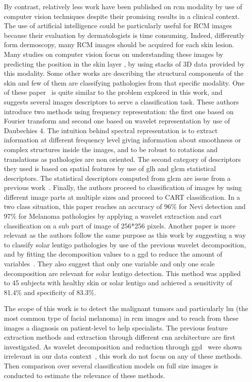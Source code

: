 \documentclass[journal,article,submit,moreauthors,pdftex, applsci]{Definitions/mdpi}
\begin{document}
By contrast, relatively less work have been published on \ac{rcm} modality by use of computer vision techniques despite their promising results in a clinical context. The use of artificial intelligence could be particularly useful for RCM images because their evaluation by  dermatologists is time consuming. Indeed, differently form dermoscopy, many RCM images should be acquired for each skin lesion. Many studies on computer vision focus on understanding these images by predicting the position in the skin layer \cite{Somoza2014,Hames2016}, by using stacks of 3D data provided by this modality. Some other works are describing the structural components of the skin \cite{Gareau2010} and few of them are classifying pathologies from that specific modality. One of these paper~\cite{Wiltgen2008} is quite similar to the problem explored in this work, and suggests several images descriptors to serve a classification task. These authors introduce two methods using frequency representation: the first one based on Fourier transform and second one based on wavelet representation by use of Daubechies 4. The intuition behind spectral representation is to extract information at different frequency level giving information about smoothness or complex structures inside the images, and to be robust to rotations and translations as pathologies are non oriented. The second category of descriptors they used is based on spatial features by use of \ac{glh} and \ac{glcm} statistical descriptors. The statistical descriptors computed from \ac{glcm} are issue from a previous work~\cite{Haralick1973}. Finally, the authors proceed to classification of images by using different image parts at multiple sizes and proceed to CART classification. In a two class situation, this paper reaches an accuracy of 96\% for Nevi detection and 97\% for Melanoma pathologies by applying a wavelet extraction and \ac{cart} classification on a sub part of image of 256*256 pixels. Another paper is more relevant as the authors follow the same purpose as this work by suggesting a way to classify solar lentigo pathologies by use of the previous wavelet decomposition, and by fitting the decomposition values to a \ac{ggd} to reduce the amount of variables~\cite{Halimi2017a}. They also suggest that only one variable and only one scale decomposition are relevant for solar lentigo detection. This method was applied to 45 subjects with healthy skin or solar lentigo and achieved a sensitivity of 81.4\% and specificity of 83.3\%.\par
The scope of this work is to detect the malignant tumors and particularly \ac{lm} (the most common type of facial melanoma) in \ac{rcm} images and to reach from these images a diagnosis on patient-level to help specialists. The previous feature extraction methods and extraction through different \ac{cnn} architecture are first investigated. As wavelet decomposition and reduction through \ac{ggd}~\cite{Halimi2017a} were shown irrelevant in our data context~\cite{Cendre2019a}, this work do not focus on any of these methods. Then comparison over several classification models on full size images is conducted to estimate the relevance of these methods.\par
\end{document}
